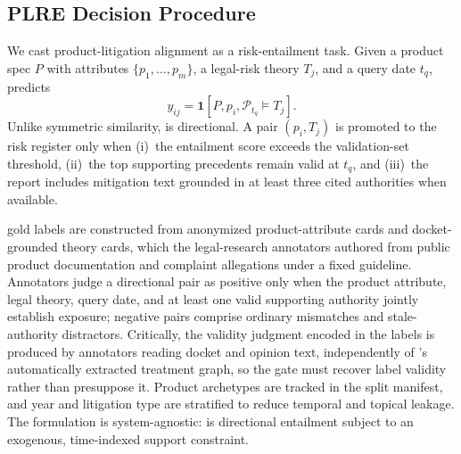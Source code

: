 \subsection{PLRE Decision Procedure}
\label{sec:plre}

We cast product-litigation alignment as a risk-entailment task.
Given a product spec $P$ with attributes $\{p_1, \ldots, p_m\}$, a legal-risk theory $T_j$, and a query date $t_q$, \plre{} predicts
\begin{equation}
y_{ij} = \mathbf{1}[P, p_i, \mathcal{P}_{t_q} \models T_j].
\end{equation}
Unlike symmetric similarity, \plre{} is directional.
A pair $(p_i, T_j)$ is promoted to the risk register only when (i)~the entailment score exceeds the validation-set threshold, (ii)~the top supporting precedents remain valid at $t_q$, and (iii)~the report includes mitigation text grounded in at least three cited authorities when available.

\plre{} gold labels are constructed from anonymized product-attribute cards and docket-grounded theory cards, which the legal-research annotators authored from public product documentation and complaint allegations under a fixed guideline.
Annotators judge a directional pair as positive only when the product attribute, legal theory, query date, and at least one valid supporting authority jointly establish exposure; negative pairs comprise ordinary mismatches and stale-authority distractors.
Critically, the validity judgment encoded in the labels is produced by annotators reading docket and opinion text, independently of \sysname{}'s automatically extracted treatment graph, so the gate must recover label validity rather than presuppose it.
Product archetypes are tracked in the split manifest, and year and litigation type are stratified to reduce temporal and topical leakage.
The formulation is system-agnostic: \plre{} is directional entailment subject to an exogenous, time-indexed support constraint.
